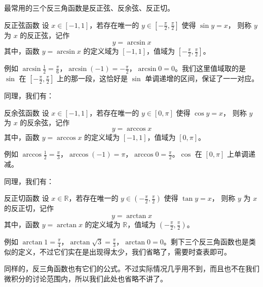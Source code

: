 最常用的三个反三角函数是反正弦、反余弦、反正切。

\begin{definition}{反正弦函数}{}
设 $x \in [-1, 1]$，若存在唯一的 $y \in [-\frac{\pi}{2}, \frac{\pi}{2}]$ 使得 $\sin y = x$，
则称 $y$ 为 $x$ 的反正弦，记作
\[
y = \arcsin x
\]
其中，函数 $y = \arcsin x$ 的定义域为 $[-1, 1]$，值域为 $[-\frac{\pi}{2}, \frac{\pi}{2}]$。
\end{definition}

例如 $\arcsin\frac{1}{2} = \frac{\pi}{6}$，$\arcsin(-1) = -\frac{\pi}{2}$，$\arcsin 0 = 0$。我们这里值域取的是 $\sin$ 在 $[-\frac{\pi}{2}, \frac{\pi}{2}]$ 上的那一段，这恰好是 $\sin$ 单调递增的区间，保证了一一对应。

同理，我们有：

\begin{definition}{反余弦函数}{}
设 $x \in [-1, 1]$，若存在唯一的 $y \in [0, \pi]$ 使得 $\cos y = x$，
则称 $y$ 为 $x$ 的反余弦，记作
\[
y = \arccos x
\]
其中，函数 $y = \arccos x$ 的定义域为 $[-1, 1]$，值域为 $[0, \pi]$。
\end{definition}

例如 $\arccos\frac{1}{2} = \frac{\pi}{3}$，$\arccos(-1) = \pi$，$\arccos 0 = \frac{\pi}{2}$。$\cos$ 在 $[0, \pi]$ 上单调递减。

同理，我们有：

\begin{definition}{反正切函数}{}
设 $x \in \mathbb{R}$，若存在唯一的 $y \in (-\frac{\pi}{2}, \frac{\pi}{2})$ 使得 $\tan y = x$，
则称 $y$ 为 $x$ 的反正切，记作
\[
y = \arctan x
\]
其中，函数 $y = \arctan x$ 的定义域为 $\mathbb{R}$，值域为 $(-\frac{\pi}{2}, \frac{\pi}{2})$。
\end{definition}

例如 $\arctan 1 = \frac{\pi}{4}$，$\arctan\sqrt{3} = \frac{\pi}{3}$，$\arctan 0 = 0$。剩下三个反三角函数也是类似的定义，不过它们实在是出现得太少，我们省略了，需要时查表即可。

同样的，反三角函数也有它们的公式。不过实际情况几乎用不到，而且也不在我们微积分的讨论范围内，所以我们此处也省略不讲了。


